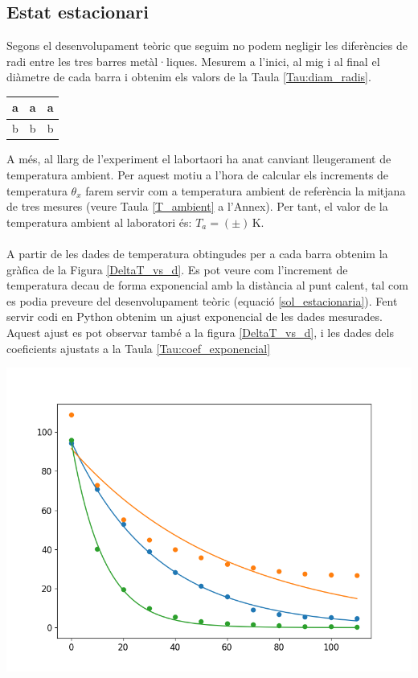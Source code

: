 \documentclass[12pt,twosides,onecolumn,openany]{article}
\newenvironment{Figura}
  {\par\medskip\noindent\minipage{\linewidth}}
  {\endminipage\par\medskip}
\begin{document}
\begin{multicols}{2}
\subsection{Estat estacionari}
Segons el desenvolupament teòric que seguim no podem negligir les diferències de radi entre les tres barres metàl·liques. Mesurem a l'inici, al mig i al final el diàmetre de cada barra i obtenim els valors de la Taula \ref{Tau:diam_radis}.
\begin{Figura}
  \centering
  \begin{tabular}{c|c|c}
    a & a & a\\
    \hline\hline
    b & b & b
  \end{tabular}
  \label{Tau:diam_radis}
\end{Figura}
A més, al llarg de l'experiment el labortaori ha anat canviant lleugerament de temperatura ambient. Per aquest motiu a l'hora de calcular els increments de temperatura $\theta_x$ farem servir com a temperatura ambient de referència la mitjana de tres mesures (veure Taula \ref{T_ambient} a l'Annex). Per tant, el valor de la temperatura ambient al laboratori és: \(T_a = ( \pm )\,\text{K}\).\\\\
A partir de les dades de temperatura obtingudes per a cada barra obtenim la gràfica de la Figura \ref{DeltaT_vs_d}. Es pot veure com l'increment de temperatura decau de forma exponencial amb la distància al punt calent, tal com es podia preveure del desenvolupament teòric (equació \eqref{sol_estacionaria}). Fent servir codi en Python obtenim un ajust exponencial de les dades mesurades. Aquest ajust es pot observar també a la figura \ref{DeltaT_vs_d}, i les dades dels coeficients ajustats a la Taula \ref{Tau:coef_exponencial}
\begin{Figura}
  \centering
  \includegraphics[width = 1\linewidth]{../../graphs/practica_Ia/plots/ln_theta.png}\label{DeltaT_vs_d}
\end{Figura}


\end{multicols}
\end{document}
